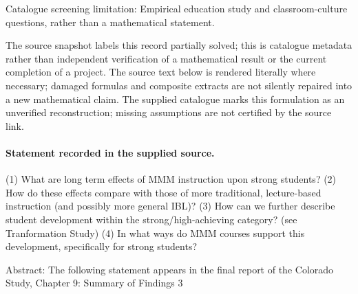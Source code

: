 \documentclass[11pt]{article}
\begin{document}
Catalogue screening limitation: Empirical education study and classroom-culture questions, rather than a mathematical statement.

The source snapshot labels this record partially solved; this is catalogue metadata rather than independent verification of a mathematical result or the current completion of a project.
The source text below is rendered literally where necessary; damaged formulas and composite extracts are not silently repaired into a new mathematical claim.
The supplied catalogue marks this formulation as an unverified reconstruction; missing assumptions are not certified by the source link.
\paragraph{Statement recorded in the supplied source.}
(1) What are long term effects of MMM instruction upon strong students? (2) How do these effects compare with those of more traditional, lecture-based instruction (and possibly more general IBL)? (3) How can we further describe student development within the strong/high-achieving category? (see Tranformation Study) (4) In what ways do MMM courses support this development, specifically for strong students?

Abstract: The following statement appears in the final report of the Colorado Study, Chapter 9: Summary of Findings 3
\end{document}
